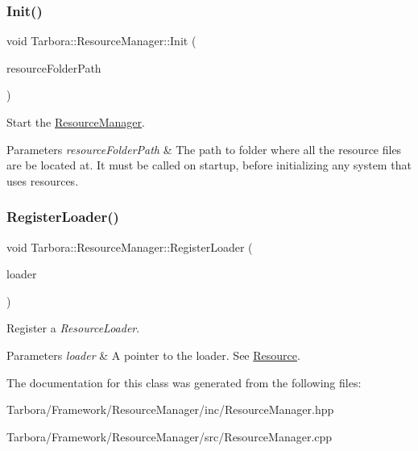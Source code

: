 \subsubsection{\texorpdfstring{Init()}{Init()}}
{\footnotesize\ttfamily void Tarbora\+::\+Resource\+Manager\+::\+Init (\begin{DoxyParamCaption}\item[{const std\+::string}]{resource\+Folder\+Path }\end{DoxyParamCaption})\hspace{0.3cm}{\ttfamily [static]}}



Start the \hyperlink{classTarbora_1_1ResourceManager}{Resource\+Manager}. 


\begin{DoxyParams}{Parameters}
{\em resource\+Folder\+Path} & The path to folder where all the resource files are be located at. It must be called on startup, before initializing any system that uses resources. \\
\hline
\end{DoxyParams}
\mbox{\label{classTarbora_1_1ResourceManager_a531683525f49833ac4b06916cd8a2bc8}} 
\subsubsection{\texorpdfstring{Register\+Loader()}{RegisterLoader()}}
{\footnotesize\ttfamily void Tarbora\+::\+Resource\+Manager\+::\+Register\+Loader (\begin{DoxyParamCaption}\item[{Loader\+Ptr}]{loader }\end{DoxyParamCaption})\hspace{0.3cm}{\ttfamily [static]}}



Register a {\itshape Resource\+Loader}. 


\begin{DoxyParams}{Parameters}
{\em loader} & A pointer to the loader. See \hyperlink{classTarbora_1_1Resource}{Resource}. \\
\hline
\end{DoxyParams}


The documentation for this class was generated from the following files\+:\begin{DoxyCompactItemize}
\item 
Tarbora/\+Framework/\+Resource\+Manager/inc/Resource\+Manager.\+hpp\item 
Tarbora/\+Framework/\+Resource\+Manager/src/Resource\+Manager.\+cpp\end{DoxyCompactItemize}
